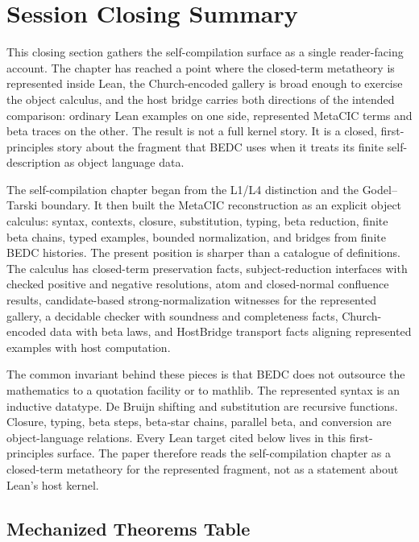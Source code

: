 \section{Session Closing Summary}
\label{sec:session-closing-summary}

This closing section gathers the self-compilation surface as a single
reader-facing account.  The chapter has reached a point where the
closed-term metatheory is represented inside Lean, the Church-encoded gallery
is broad enough to exercise the object calculus, and the host bridge carries
both directions of the intended comparison: ordinary Lean examples on one
side, represented MetaCIC terms and beta traces on the other.  The result is
not a full kernel story.  It is a closed, first-principles story about the
fragment that BEDC uses when it treats its finite self-description as object
language data.

The self-compilation chapter began from the L1/L4 distinction and the
Godel--Tarski boundary.  It then built the MetaCIC reconstruction as an
explicit object calculus: syntax, contexts, closure, substitution, typing,
beta reduction, finite beta chains, typed examples, bounded normalization, and
bridges from finite BEDC histories.  The present position is sharper than a
catalogue of definitions.  The calculus has closed-term preservation facts,
subject-reduction interfaces with checked positive and negative resolutions,
atom and closed-normal confluence results, candidate-based strong-normalization
witnesses for the represented gallery, a decidable checker with soundness and
completeness facts, Church-encoded data with beta laws, and HostBridge
transport facts aligning represented examples with host computation.

The common invariant behind these pieces is that BEDC does not outsource the
mathematics to a quotation facility or to mathlib.  The represented syntax is
an inductive datatype.  De Bruijn shifting and substitution are recursive
functions.  Closure, typing, beta steps, beta-star chains, parallel beta, and
conversion are object-language relations.  Every Lean target cited below lives
in this first-principles surface.  The paper therefore reads the
self-compilation chapter as a closed-term metatheory for the represented
fragment, not as a statement about Lean's host kernel.

\subsection{Mechanized Theorems Table}
\label{subsec:session-closing-mechanized-theorems}

